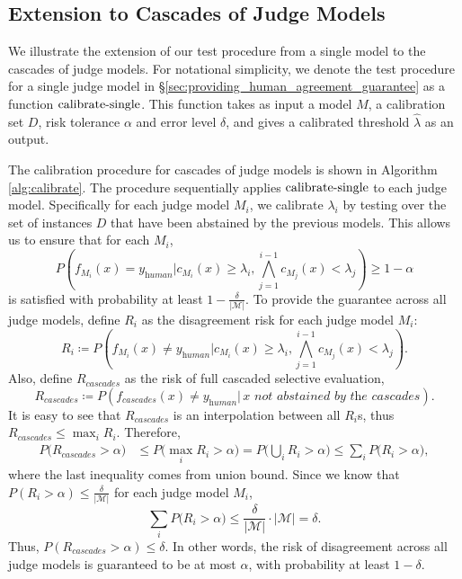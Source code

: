 \subsection{Extension to Cascades of Judge Models} \label{app:cascades_of_judge_models}

We illustrate the extension of our test procedure from a single model to the cascades of judge models. For notational simplicity, we denote the test procedure for a single judge model in \S \ref{sec:providing_human_agreement_guarantee} as a function $\operatorname*{calibrate-single}$. This function takes as input a model $M$, a calibration set $D$, risk tolerance $\alpha$ and error level $\delta$, and gives a calibrated threshold $\widehat{\lambda}$ as an output.

The calibration procedure for cascades of judge models is shown in Algorithm \ref{alg:calibrate}. The procedure sequentially applies $\operatorname*{calibrate-single}$ to each judge model. Specifically for each judge model $M_i$, we calibrate $\lambda_i$ by testing over the set of instances $D$ that have been abstained by the previous models. This allows us to ensure that for each $M_i$,
\begin{equation*}
    P\left(f_{M_i}(x) = y_\textit{human} \Bigg| c_{M_i}(x) \ge \lambda_i, \bigwedge_{j=1}^{i-1} c_{M_j}(x) < \lambda_j\right) \ge 1 - \alpha
\end{equation*}
is satisfied with probability at least $1 - \frac{\delta}{|\mathcal{M}|}$. To provide the guarantee across all judge models, define $R_i$ as the disagreement risk for each judge model $M_i$:
\begin{equation*}
    R_i \coloneqq P\left(f_{M_i}(x) \neq y_\textit{human} \Bigg| c_{M_i}(x) \ge \lambda_i, \bigwedge_{j=1}^{i-1} c_{M_j}(x) < \lambda_j\right).
\end{equation*}
Also, define $R_\textit{cascades}$ as the risk of full cascaded selective evaluation, \ie
\begin{equation*}
    R_\textit{cascades} \coloneqq P(f_\textit{cascades}(x) \neq y_\textit{human} |\,x \textit{ not abstained by the cascades}).
\end{equation*}
It is easy to see that $R_\textit{cascades}$ is an interpolation between all $R_i$s, thus $R_\textit{cascades} \leq \max_i R_i$. Therefore,
\begin{align*}
    P\big(R_\textit{cascades} > \alpha \big) & \leq P\big(\max_i R_i > \alpha\big) = P\bigg(\bigcup_i R_i > \alpha \bigg) \leq \sum_i P\big(R_i > \alpha \big),
\end{align*}
where the last inequality comes from union bound. Since we know that $P(R_i > \alpha) \leq \frac{\delta}{|\mathcal{M}|}$ for each judge model $M_i$, 
\begin{equation*}
    \sum_i P\big(R_i > \alpha \big) \leq \frac{\delta}{|\mathcal{M}|} \cdot |\mathcal{M}| = \delta.
\end{equation*}
Thus, $P(R_\textit{cascades} > \alpha) \leq \delta$. In other words, the risk of disagreement across all judge models is guaranteed to be at most $\alpha$, with probability at least $1 - \delta$.

